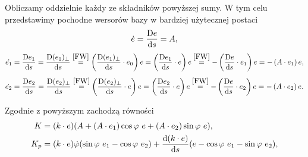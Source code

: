 Obliczamy oddzielnie każdy ze składników powyższej sumy.
W tym celu przedstawimy pochodne wersorów bazy w bardziej
użytecznej postaci 
\begin{align*}
\dot{e}= \frac{\text{D} e}{\text{d} s} = A,
\end{align*}
\begin{align*}
\dot{e_1}= \frac{\text{D} e_1 }{\text{d} s} = \frac{\text{D} (e_1)_\perp }{\text{d} s} 
\stackrel{\eqref{FW}}{=} 
\left(\frac{\text{D} (e_1)_\perp }{\text{d} s}\cdot e_0\right)e 
= \left(\frac{\text{D} e_1 }{\text{d} s}\cdot e\right)e 
\stackrel{\eqref{FW}}{=} 
 - \left(\frac{\text{D} e }{\text{d} s}\cdot e_1\right)e
= - \left(A\cdot e_1\right)e,
\end{align*}
\begin{align*}
\dot{e_2}= \frac{\text{D} e_2 }{\text{d} s} = \frac{\text{D} (e_2)_\perp }{\text{d} s} 
\stackrel{\eqref{FW}}{=} 
\left(\frac{\text{D} (e_2)_\perp }{\text{d} s}\cdot e\right)e
= \left(\frac{\text{D} e_2 }{\text{d} s}\cdot e\right)e 
\stackrel{\eqref{FW}}{=} 
 - \left(\frac{\text{D} e }{\text{d} s}\cdot e_2\right)e
= - \left(A\cdot e_2\right)e.
\end{align*}

Zgodnie z powyższym zachodzą równości
\begin{align*}
K &= (k\cdot e) (A + \left(A\cdot e_1\right)\cos\varphi\ e+ 
\left(A\cdot e_2\right)\sin\varphi\ e ), \\
K_p &= (k\cdot e) \dot{\varphi} ( \sin\varphi\ e_1 - \cos\varphi\ e_2  ) + 
\frac{\d(k\cdot e)}{\d s} (e-\cos\varphi\ e_1 - \sin\varphi\ e_2) ,
\end{align*}

